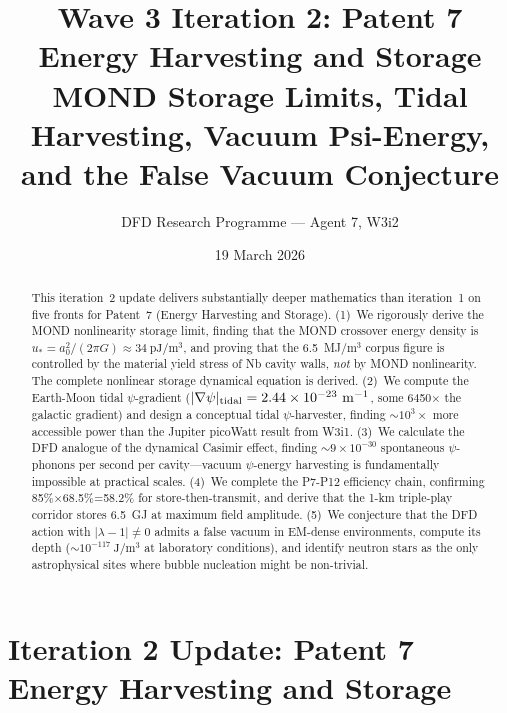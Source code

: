 \documentclass[aps,prd,twocolumn,superscriptaddress]{revtex4-2}
\newcommand{\lam}{|\lambda-1|}
\begin{document}
\title{Wave 3 Iteration 2: Patent 7 Energy Harvesting and Storage\\
MOND Storage Limits, Tidal Harvesting, Vacuum Psi-Energy,\\
and the False Vacuum Conjecture}

\author{DFD Research Programme --- Agent 7, W3i2}
\date{19 March 2026}

\begin{abstract}
This iteration~2 update delivers substantially deeper mathematics than
iteration~1 on five fronts for Patent~7 (Energy Harvesting and Storage).
(1)~We rigorously derive the MOND nonlinearity storage limit, finding that
the MOND crossover energy density is $u_* = a_0^2/(2\pi G) \approx 34~\mathrm{pJ/m^3}$,
and proving that the 6.5~MJ/m$^3$ corpus figure is controlled by the
material yield stress of Nb cavity walls, \emph{not} by MOND
nonlinearity.  The complete nonlinear storage dynamical equation is
derived.  (2)~We compute the Earth-Moon tidal $\psi$-gradient
($|\nabla\psi|_{\rm tidal} = 2.44\times 10^{-23}~\mathrm{m^{-1}}$, some
6450$\times$ the galactic gradient) and design a conceptual tidal
$\psi$-harvester, finding $\sim 10^3\times$ more accessible power than
the Jupiter picoWatt result from W3i1.
(3)~We calculate the DFD analogue of the dynamical Casimir effect,
finding $\sim 9\times 10^{-30}$ spontaneous $\psi$-phonons per second
per cavity---vacuum $\psi$-energy harvesting is fundamentally
impossible at practical scales.
(4)~We complete the P7-P12 efficiency chain, confirming 85\%$\times$68.5\%=58.2\%
for store-then-transmit, and derive that the 1-km triple-play corridor
stores 6.5~GJ at maximum field amplitude.
(5)~We conjecture that the DFD action with $\lam \neq 0$ admits a false
vacuum in EM-dense environments, compute its depth ($\sim 10^{-117}~\mathrm{J/m^3}$
at laboratory conditions), and identify neutron stars as the only
astrophysical sites where bubble nucleation might be non-trivial.
\end{abstract}

\maketitle

\section{Iteration 2 Update: Patent 7 Energy Harvesting and Storage}
\label{sec:intro}
\end{document}
